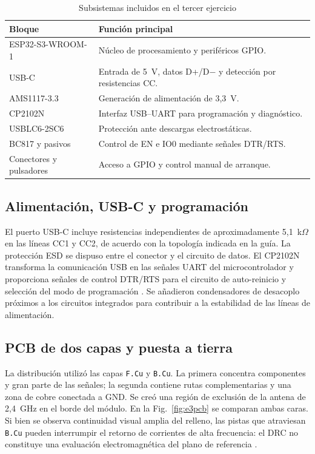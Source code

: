 \documentclass[journal,10pt]{IEEEtran}
\begin{document}
\begin{table}[H]
\caption{Subsistemas incluidos en el tercer ejercicio}
\label{tab:bloques}
\centering
\footnotesize
\begin{tabularx}{\columnwidth}{@{}p{}X@{}}
\toprule
\textbf{Bloque} & \textbf{Función principal} \\
\midrule
ESP32-S3-WROOM-1 & Núcleo de procesamiento y periféricos GPIO. \\
USB-C & Entrada de 5~V, datos D+/D$-$ y detección por resistencias CC. \\
AMS1117-3.3 & Generación de alimentación de 3,3~V. \\
CP2102N & Interfaz USB--UART para programación y diagnóstico. \\
USBLC6-2SC6 & Protección ante descargas electrostáticas. \\
BC817 y pasivos & Control de EN e IO0 mediante señales DTR/RTS. \\
Conectores y pulsadores & Acceso a GPIO y control manual de arranque. \\
\bottomrule
\end{tabularx}
\end{table}

\subsection{Alimentación, USB-C y programación}
El puerto USB-C incluye resistencias independientes de aproximadamente 5,1~k$\Omega$ en las líneas CC1 y CC2, de acuerdo con la topología indicada en la guía. La protección ESD se dispuso entre el conector y el circuito de datos. El CP2102N transforma la comunicación USB en las señales UART del microcontrolador y proporciona señales de control DTR/RTS para el circuito de auto-reinicio y selección del modo de programación \cite{silabs}. Se añadieron condensadores de desacoplo próximos a los circuitos integrados para contribuir a la estabilidad de las líneas de alimentación.

\subsection{PCB de dos capas y puesta a tierra}
La distribución utilizó las capas \texttt{F.Cu} y \texttt{B.Cu}. La primera concentra componentes y gran parte de las señales; la segunda contiene rutas complementarias y una zona de cobre conectada a GND. Se creó una región de exclusión de la antena de 2,4~GHz en el borde del módulo. En la Fig.~\ref{fig:e3pcb} se comparan ambas caras. Si bien se observa continuidad visual amplia del relleno, las pistas que atraviesan \texttt{B.Cu} pueden interrumpir el retorno de corrientes de alta frecuencia: el DRC no constituye una evaluación electromagnética del plano de referencia \cite{espressif}.
\end{document}

